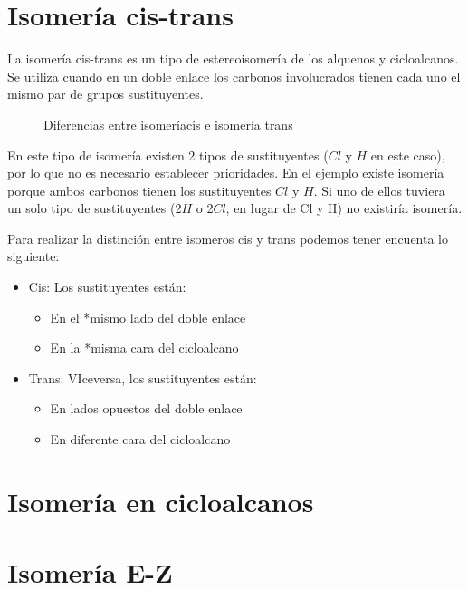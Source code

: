 \section{Isomería cis-trans}

La isomería cis-trans es un tipo de estereoisomería de los alquenos y cicloalcanos. Se utiliza cuando en un doble enlace los carbonos involucrados tienen cada uno el mismo par de grupos sustituyentes.

\begin{figure}[H]
    \centering
    \caption{Diferencias entre isomeríacis e isomería trans}
    \label{fig:}
\end{figure}

En este tipo de isomería existen 2 tipos de sustituyentes ($Cl$ y $H$ en este caso), por lo que no es necesario establecer prioridades. En el ejemplo existe isomería porque ambos carbonos tienen los sustituyentes $Cl$ y $H$. Si uno de ellos tuviera un solo tipo de sustituyentes (2$H$ o 2$Cl$, en lugar de Cl y H) no existiría isomería.

Para realizar la distinción entre isomeros cis y trans podemos tener encuenta lo siguiente:

\begin{itemize}
    \item Cis: Los sustituyentes están:
    \begin{itemize}
        \item En el *mismo lado del doble enlace
        \item En la *misma cara del cicloalcano
    \end{itemize}
    
    \item Trans: VIceversa, los sustituyentes están:
    \begin{itemize}
        \item En lados opuestos del doble enlace
    	\item En diferente cara del cicloalcano
    \end{itemize}
\end{itemize}

\section{Isomería en cicloalcanos}


\section{Isomería E-Z}

